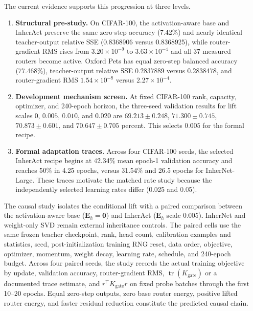 \documentclass{article}
\DeclareMathOperator{\tr}{tr}
\newcommand{\bE}{\mathbf{E}}
\begin{document}
The current evidence supports this progression at three levels.
\begin{enumerate}
  \item \textbf{Structural pre-study.} On CIFAR-100, the activation-aware base
        and InherAct preserve the same zero-step accuracy (7.42\%) and nearly
        identical teacher-output relative SSE (0.8368906 versus
        0.8368925), while router-gradient RMS rises from
        $3.20\times10^{-9}$ to $3.63\times10^{-4}$ and all 37 measured routers
        become active. Oxford Pets has equal zero-step balanced accuracy
        (77.468\%), teacher-output relative SSE 0.2837889 versus 0.2838478, and
        router-gradient RMS
        $1.54\times10^{-9}$ versus $2.27\times10^{-4}$.
  \item \textbf{Development mechanism screen.} At fixed CIFAR-100 rank,
        capacity, optimizer, and 240-epoch horizon, the three-seed validation
        results for lift scales $0$, $0.005$, $0.010$, and $0.020$ are
        $69.213\pm0.248$, $71.300\pm0.745$, $70.873\pm0.601$, and
        $70.647\pm0.705$ percent. This selects $0.005$ for the formal recipe.
  \item \textbf{Formal adaptation traces.} Across four CIFAR-100 seeds, the
        selected InherAct recipe begins at 42.34\% mean epoch-1 validation
        accuracy and reaches 50\% in 4.25 epochs, versus 31.54\% and 26.5 epochs
        for InherNet-Large. These traces motivate the matched rate study because
        the independently selected learning rates differ (0.025 and 0.05).
\end{enumerate}

The causal study isolates the conditional lift with a paired comparison between
the activation-aware base ($\bE_h=\mathbf{0}$) and InherAct ($\bE_h$ scale
$0.005$). InherNet and weight-only SVD remain external inheritance controls.
The paired cells use the same frozen teacher checkpoint, rank, head count,
calibration examples and statistics, seed, post-initialization training RNG
reset, data order, objective, optimizer, momentum, weight decay, learning rate,
schedule, and 240-epoch budget. Across four paired seeds, the study records the
actual training objective by update, validation accuracy, router-gradient RMS,
$\tr(K_{\mathrm{gate}})$ or a documented trace estimate, and
$r^\top K_{\mathrm{gate}}r$ on fixed probe batches through the first 10--20
epochs. Equal zero-step outputs, zero base router energy, positive lifted router
energy, and faster residual reduction constitute the predicted causal chain.
\end{document}
